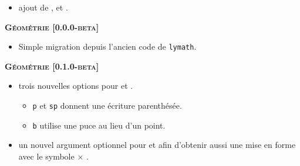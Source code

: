 \documentclass[12pt,a4paper]{book}
\begin{document}
\begin{description}
    \begin{itemize}[itemsep=.5em]
        \item {} ajout de ,  et .
    \end{itemize}
    
    
    \separation
    
    
    
    
    \begin{center}
        \textbf{\textsc{Géométrie [0.0.0-beta]}}
    \end{center}
    
    \begin{itemize}[itemsep=.5em]
        \item Simple migration depuis l'ancien code de \verb+lymath+.
    \end{itemize}
    
    
    \begin{center}
        \textbf{\textsc{Géométrie [0.1.0-beta]}}
    \end{center}
    
    \begin{itemize}[itemsep=.5em]
        \item {}
              trois nouvelles options pour  et .
        \begin{itemize}[itemsep=.5em]
            \item \verb+p+ et \verb+sp+ donnent une écriture parenthésée.
    
            \item \verb+b+ utilise une puce au lieu d'un point.
        \end{itemize}
    
    
    	
    
    
        \item {}
              un nouvel argument optionnel pour  et  afin d'obtenir aussi une mise en forme avec le symbole $\times$ .
    
    
        
    \end{itemize}
    
    
    \separation
    
    
    

\end{description}
\end{document}

